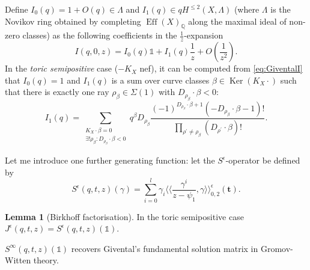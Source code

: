 \documentclass[11pt]{amsart}
\newcommand{\QQ}{\mathbb{Q}}
\newcommand{\lala}{\langle\!\langle}
\newcommand{\rara}{\rangle\!\rangle}
\theoremstyle{definition}
\newtheorem{lem}[thm]{Lemma}
\theoremstyle{definition}
\newcommand{\ilemph}[1]{\emph{#1}}
\begin{document}
Define $I_0(q)= 1+O(q)\in \Lambda$ and $I_1(q)\in qH^{\leq 2}(X,\Lambda)$ (where $\Lambda$ is the Novikov ring obtained by completing $\operatorname{Eff}(X)_\QQ$ along the maximal ideal of non-zero classes) as the following coefficients in the $\frac{1}{z}$-expansion
\[I(q,0,z)=I_0(q)\mathds{1}+I_1(q)\frac{1}{z}+O(\frac{1}{z^2}).\]
In the \ilemph{toric semipositive} case ($-K_X$ nef), it can be computed from \eqref{eq:GiventalI} that $I_0(q)=1$ and $I_1(q)$ is a sum over curve classes $\beta\in \operatorname{Ker}(K_X\cdot )$ such that there is exactly one ray $\rho_\beta\in\Sigma(1)$ with $D_{\rho_\beta}\cdot\beta <0$:
\[I_1(q)=\sum_{\substack{K_X\cdot\beta=0 \\ \exists!\rho_\beta:D_{\rho_\beta}\cdot\beta<0}}q^\beta D_{\rho_\beta}\frac{(-1)^{D_{\rho_\beta}\cdot\beta+1}(-D_{\rho_\beta}\cdot\beta-1)!}{\prod_{\rho^\prime\neq\rho_\beta}(D_{\rho^\prime}\cdot\beta)!}.\]

Let me introduce one further generating function: let the $S^\epsilon$-operator be defined by
\[S^\epsilon(q,t,z)(\gamma)=\sum_{i=0}^l \gamma_i \lala \frac{\gamma^i}{z-\psi_1},\gamma\rara^\epsilon_{0,2}(\mathbf{t}).\]

\begin{lem}[Birkhoff factorisation] \cite[Theorem 1.3.1]{CF-K-wallcrossing} In the toric semipositive case $J^\epsilon(q,t,z)=S^\epsilon(q,t,z)(\mathds{1})$. \end{lem}

$S^\infty(q,t,z)(\mathds{1})$ recovers Givental's fundamental solution matrix in Gromov-Witten theory.
\end{document}

